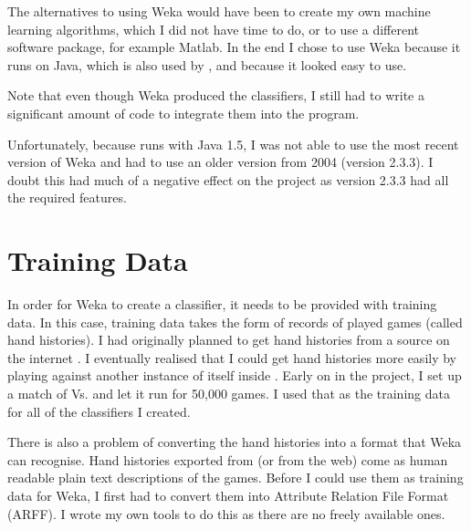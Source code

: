 The alternatives to using Weka would have been to create my own machine learning algorithms, which I did not have time to do, or to use a different software package, for example Matlab. In the end I chose to use Weka because it runs on Java, which is also used by \pap, and because it looked easy to use. 

Note that even though Weka produced the classifiers, I still had to write a significant amount of code to integrate them into the program.

Unfortunately, because \pa runs with Java 1.5, I was not able to use the most recent version of Weka and had to use an older version from 2004 (version 2.3.3). I doubt this had much of a negative effect on the project as version 2.3.3 had all the required features. 




\section{Training Data}							%



In order for Weka to create a classifier, it needs to be provided with training data. In this case, training data takes the form of records of played games (called hand histories). I had originally planned to get hand histories from a source on the internet \cite{dataminedhhs}. I eventually realised that I could get hand histories more easily by playing \sbt against another instance of itself inside \pap. Early on in the project, I set up a match of \sbt Vs. \sbt and let it run for 50,000 games. I used that as the training data for all of the classifiers I created.

There is also a problem of converting the hand histories into a format that Weka can recognise. Hand histories exported from \pa (or from the web) come as human readable plain text descriptions of the games. Before I could use them as training data for Weka, I first had to convert them into Attribute Relation File Format (ARFF). I wrote my own tools to do this as there are no freely available ones. 




